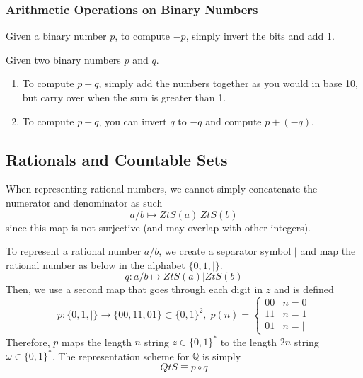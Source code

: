   \subsubsection{Arithmetic Operations on Binary Numbers}

    \begin{theorem}
      Given a binary number $p$, to compute $-p$, simply invert the bits and add 1.
    \end{theorem}

    \begin{theorem}
      Given two binary numbers $p$ and $q$. 
      \begin{enumerate}
        \item To compute $p + q$, simply add the numbers together as you would in base 10, but carry over when the sum is greater than 1. 
        \item To compute $p - q$, you can invert $q$ to $-q$ and compute $p + (-q)$. 
      \end{enumerate}
    \end{theorem}


\subsection{Rationals and Countable Sets}
  
  When representing rational numbers, we cannot simply concatenate the numerator and denominator as such
  \[a/b \mapsto ZtS(a) \, ZtS(b)\]
  since this map is not surjective (and may overlap with other integers). 

  \begin{definition}
    To represent a rational number $a/b$, we create a separator symbol $|$ and map the rational number as below in the alphabet $\{0, 1, |\}$. 
    \[q: a/b \mapsto ZtS(a) | ZtS(b)\]
    Then, we use a second map that goes through each digit in $z$ and is defined 
    \[p: \{0, 1, |\} \longrightarrow \{00,11,01\} \subset \{0, 1\}^2, \; p(n) = \begin{cases}
    00 & n = 0 \\
    11 & n = 1 \\
    01 & n = |
    \end{cases}\]
    Therefore, $p$ maps the length $n$ string $z \in \{0, 1\}^\ast$ to the length $2n$ string $\omega \in \{0, 1\}^\ast$. The representation scheme for $\mathbb{Q}$ is simply 
    \[QtS \equiv p \circ q\]
  \end{definition}


